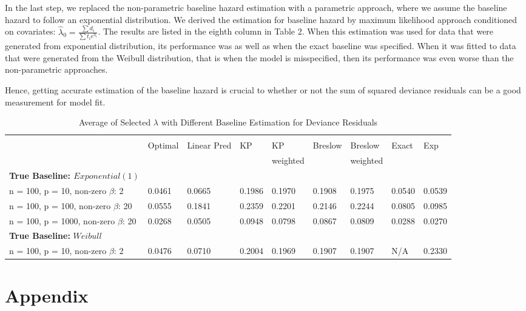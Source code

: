 \par In the last step, we replaced the non-parametric baseline hazard estimation with a parametric approach, where we assume the baseline hazard to follow an exponential distribution. We derived the estimation for baseline hazard by maximum likelihood approach conditioned on covariates: $\hat{\lambda}_{0} = \frac{\sum d_{i}}{\sum t_{i}e^{\eta_{i}}}$. The results are listed in the eighth column in Table 2. When this estimation was used for data that were generated from exponential distribution, its performance was as well as when the exact baseline was specified. When it was fitted to data that were generated from the Weibull distribution, that is when the model is misspecified, then its performance was even worse than the non-parametric approaches.

\par Hence, getting accurate estimation of the baseline hazard is crucial to whether or not the sum of squared deviance residuals can be a good measurement for model fit.

\begin{table}[h]
	\small
	\caption{Average of Selected $\lambda$ with Different Baseline Estimation for Deviance Residuals}
	\centering
	\begin{tabular}{lllllllll}
	\hline
	\\[-0.75em]
    & Optimal & Linear Pred & KP & KP & Breslow & Breslow & Exact & Exp\\ 
    &  & & & weighted & & weighted & & \\ \cline{2 - 9} 
	\textbf{True Baseline: $Exponential(1)$} &&&&&&&&\\
	n = 100, p = 10, non-zero $\beta$: 2 & 0.0461 & 0.0665 & 0.1986 & 0.1970 & 0.1908 & 0.1975 & 0.0540 & 0.0539 \\
	n = 100, p = 100, non-zero $\beta$: 20 &0.0555 & 0.1841 & 0.2359 & 0.2201 & 0.2146 & 0.2244 & 0.0805 & 0.0985 \\
	n = 100, p = 1000, non-zero $\beta$: 20 & 0.0268 & 0.0505 & 0.0948 & 0.0798 & 0.0867 & 0.0809 & 0.0288 & 0.0270 \\
	\textbf{True Baseline:} $Weibull$ &&&&&&&& \\
 	n = 100, p = 10, non-zero $\beta$: 2 & 0.0476 & 0.0710 & 0.2004 & 0.1969 & 0.1907 & 0.1907 & N/A & 0.2330 \\ 
	\hline
\end{tabular}
\end{table}


\section{Appendix}

